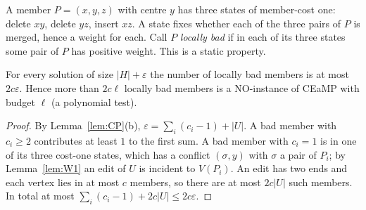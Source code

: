 A member $P=(x,y,z)$ with centre $y$ has three states of member-cost one: delete $xy$, delete $yz$, insert $xz$. A state fixes whether each of the three pairs of $P$ is merged, hence a weight for each. Call $P$ \emph{locally bad} if in each of its three states some pair of $P$ has positive weight. This is a static property.
\begin{lemma}\label{lem:BAD}
For every solution of size $|H|+\varepsilon$ the number of locally bad members is at most $2c\varepsilon$. Hence more than $2c\ell$ locally bad members is a NO-instance of CEaMP with budget $\ell$ (a polynomial test).
\end{lemma}
\begin{proof}
By Lemma~\ref{lem:CP}(b), $\varepsilon=\sum_i(c_i-1)+|U|$. A bad member with $c_i\ge2$ contributes at least $1$ to the first sum. A bad member with $c_i=1$ is in one of its three cost-one states, which has a conflict $(\sigma,y)$ with $\sigma$ a pair of $P_i$; by Lemma~\ref{lem:W1} an edit of $U$ is incident to $V(P_i)$. An edit has two ends and each vertex lies in at most $c$ members, so there are at most $2c|U|$ such members. In total at most $\sum_i(c_i-1)+2c|U|\le2c\varepsilon$.
\end{proof}

